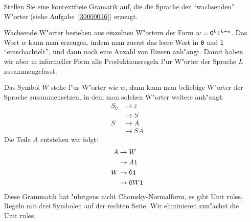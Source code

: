 Stellen Sie eine kontextfreie Gramatik auf, die die Sprache der ``wachsenden''
W"orter  (siehe Aufgabe~\ref{30000016}) erzeugt.

\begin{loesung}
Wachsende W"orter bestehen aus einzelnen W"ortern der Form
$w={\tt 0}^k{\tt 1}^{k+s}$.  Das Wort $w$ kann man erzeugen,
indem man zuerst das leere Wort in {\tt 0} und {\tt 1}
``einschachtelt'', und dann noch eine Anzahl von Einsen anh"angt.
Damit haben wir aber in informeller Form alle Produktionsregeln
f"ur W"orter der Sprache $L$ zusammengefasst.

Das Symbol $W$ stehe f"ur W"orter wie $w$, dann kann man beliebige W"orter der
Sprache zusammensetzen, in dem man solchen W"orter weitere anh"angt:
\begin{align*}
S_0&\to \varepsilon\\
   &\to S\\
S&\to A\\
 &\to SA
\end{align*}
Die Teile $A$ entstehen wir folgt:
\begin{align*}
A&\to W\\
 &\to A{\tt 1}\\
W&\to {\tt01}\\
 &\to {\tt 0}W{\tt 1}\\
\end{align*}
Diese Grammatik hat "ubrigens nicht Chomsky-Normalform, es gibt Unit rules,
Regeln mit drei Symbolen auf der rechten Seite. Wir eliminieren zun"achst
die Unit rules.


\end{loesung}
